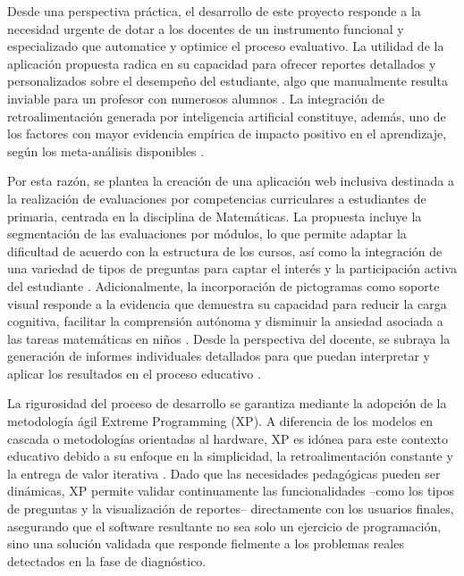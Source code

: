 Desde una perspectiva práctica, el desarrollo de este proyecto responde a la necesidad urgente de dotar a los docentes de un instrumento funcional y especializado que automatice y optimice el proceso evaluativo. La utilidad de la aplicación propuesta radica en su capacidad para ofrecer reportes detallados y personalizados sobre el desempeño del estudiante, algo que manualmente resulta inviable para un profesor con numerosos alumnos \cite{hattie2007feedback,maksimchuk2025genai}. La integración de retroalimentación generada por inteligencia artificial constituye, además, uno de los factores con mayor evidencia empírica de impacto positivo en el aprendizaje, según los meta-análisis disponibles \cite{hattie2007feedback,gonzalez2021ai}.

Por esta razón, se plantea la creación de una aplicación web inclusiva destinada a la realización de evaluaciones por competencias curriculares a estudiantes de primaria, centrada en la disciplina de Matemáticas. La propuesta incluye la segmentación de las evaluaciones por módulos, lo que permite adaptar la dificultad de acuerdo con la estructura de los cursos, así como la integración de una variedad de tipos de preguntas para captar el interés y la participación activa del estudiante \cite{debrenti2024gbl,sayed2023adaptive}. Adicionalmente, la incorporación de pictogramas como soporte visual responde a la evidencia que demuestra su capacidad para reducir la carga cognitiva, facilitar la comprensión autónoma y disminuir la ansiedad asociada a las tareas matemáticas en niños \cite{mayer2014multimedia,guillomia2021cognitive,passolunghi2016math}. Desde la perspectiva del docente, se subraya la generación de informes individuales detallados para que puedan interpretar y aplicar los resultados en el proceso educativo \cite{maskos2025fa}.

La rigurosidad del proceso de desarrollo se garantiza mediante la adopción de la metodología ágil Extreme Programming (XP). A diferencia de los modelos en cascada o metodologías orientadas al hardware, XP es idónea para este contexto educativo debido a su enfoque en la simplicidad, la retroalimentación constante y la entrega de valor iterativa \cite{beck2004xp,dyba2008agile,shrivastava2021xpreview}. Dado que las necesidades pedagógicas pueden ser dinámicas, XP permite validar continuamente las funcionalidades --como los tipos de preguntas y la visualización de reportes-- directamente con los usuarios finales, asegurando que el software resultante no sea solo un ejercicio de programación, sino una solución validada que responde fielmente a los problemas reales detectados en la fase de diagnóstico.

